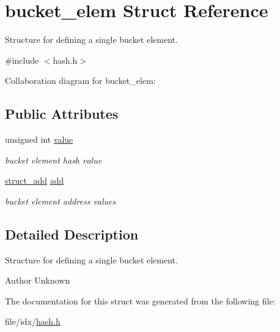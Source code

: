 \hypertarget{structbucket__elem}{}\section{bucket\+\_\+elem Struct Reference}
\label{structbucket__elem}


Structure for defining a single bucket element.  




{\ttfamily \#include $<$hash.\+h$>$}



Collaboration diagram for bucket\+\_\+elem\+:
\subsection*{Public Attributes}
\begin{DoxyCompactItemize}
\item 
unsigned int \hyperlink{structbucket__elem_acba8382505705bf798600c054f71310d}{value}\hypertarget{structbucket__elem_acba8382505705bf798600c054f71310d}{}\label{structbucket__elem_acba8382505705bf798600c054f71310d}

\begin{DoxyCompactList}\small\item\em bucket element hash value \end{DoxyCompactList}\item 
\hyperlink{structstruct__add}{struct\+\_\+add} \hyperlink{structbucket__elem_a07ad9eddc7a5bd1ebff68bbee97f075d}{add}\hypertarget{structbucket__elem_a07ad9eddc7a5bd1ebff68bbee97f075d}{}\label{structbucket__elem_a07ad9eddc7a5bd1ebff68bbee97f075d}

\begin{DoxyCompactList}\small\item\em bucket element address values \end{DoxyCompactList}\end{DoxyCompactItemize}


\subsection{Detailed Description}
Structure for defining a single bucket element. 

\begin{DoxyAuthor}{Author}
Unknown 
\end{DoxyAuthor}


The documentation for this struct was generated from the following file\+:\begin{DoxyCompactItemize}
\item 
file/idx/\hyperlink{hash_8h}{hash.\+h}\end{DoxyCompactItemize}
